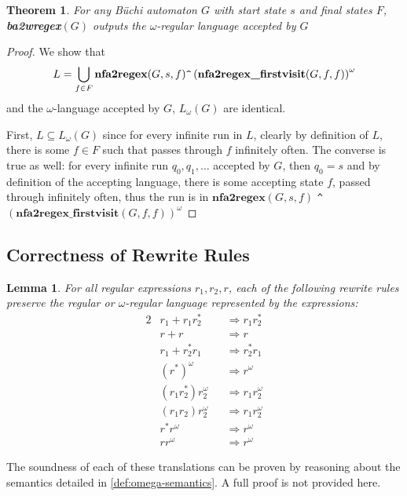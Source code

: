 \documentclass[conference]{IEEEtran}
\newtheorem{theorem}{Theorem}[section]
\newtheorem{lemma}{Lemma}[section]
\theoremstyle{definition}
\theoremstyle{remark}
\newcommand{\Buchi}{B\"{u}chi }
\begin{document}
\begin{theorem}
    For any \Buchi automaton $G$ with start state $s$ and final states $F$, \textbf{ba2wregex}$(G)$ outputs the $\omega$-regular language accepted by $G$
\end{theorem}
\begin{proof}
    We show that
    \[
        L = \bigcup_{f\in F} \textbf{nfa2regex}(G, s, f) \verb|^| \left(\textbf{nfa2regex\_firstvisit}(G, f, f)\right)^\omega
    \]
    and the $\omega$-language accepted by $G$, $L_\omega(G)$ are identical.

    First, $L\subseteq L_\omega(G)$ since for every infinite run in $L$, clearly by definition of $L$, there is some $f\in F$ such that passes through $f$ infinitely often. The converse is true as well: for every infinite run $q_0, q_1, \dots$ accepted by $G$, then $q_0 = s$ and by definition of the accepting language, there is some accepting state $f$, passed through infinitely often, thus the run is in $\textbf{nfa2regex}(G, s, f)$ \verb|^| $\left(\textbf{nfa2regex\_firstvisit}(G, f, f)\right)^\omega$
\end{proof}
\subsection{Correctness of Rewrite Rules}
\begin{lemma}
    For all regular expressions $r_1, r_2, r$, each of the following rewrite rules preserve the regular or $\omega$-regular language represented by the expressions:
    \begin{alignat}{2}
        & r_1 + r_1r_2^* && \Longrightarrow r_1r_2^* \\
        & r + r && \Longrightarrow r \\
        & r_1 + r_2^*r_1 && \Longrightarrow r_2^*r_1 \\
        & (r^*)^{\omega} && \Longrightarrow r^{\omega} \\
        & (r_1r_2^*)r_2^{\omega} && \Longrightarrow r_1r_2^{\omega} \\
        & (r_1r_2)r_2^{\omega} && \Longrightarrow r_1r_2^{\omega} \\
        & r^*r^{\omega} && \Longrightarrow r^{\omega} \\
        & rr^{\omega} && \Longrightarrow r^{\omega}
    \end{alignat}
\end{lemma}

The soundness of each of these translations can be proven by reasoning about the  semantics detailed in \cref{def:omega-semantics}. A full proof is not provided here.
\end{document}
